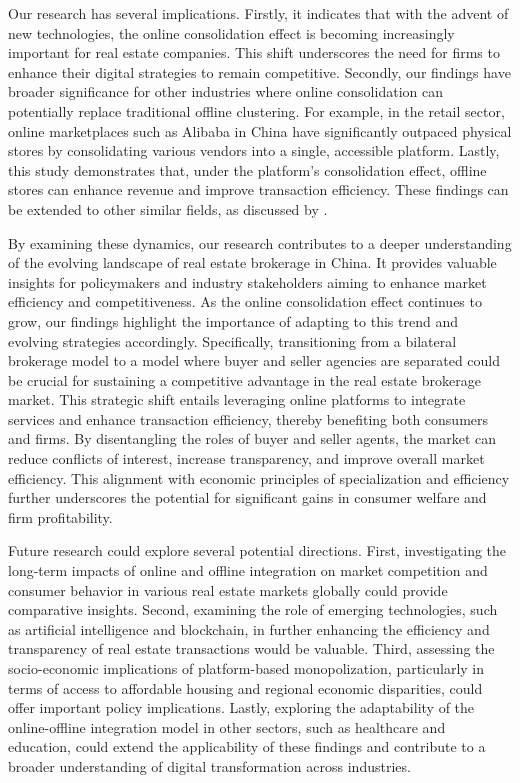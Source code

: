 \documentclass[11pt]{article}
\begin{document}
Our research has several implications. Firstly, it indicates that with the advent of new technologies, the online consolidation effect is becoming increasingly important for real estate companies. This shift underscores the need for firms to enhance their digital strategies to remain competitive. Secondly, our findings have broader significance for other industries where online consolidation can potentially replace traditional offline clustering. For example, in the retail sector, online marketplaces such as Alibaba in China have significantly outpaced physical stores by consolidating various vendors into a single, accessible platform. Lastly, this study demonstrates that, under the platform's consolidation effect, offline stores can enhance revenue and improve transaction efficiency. These findings can be extended to other similar fields, as discussed by \citep{10.1257/jep.28.2.3}.

By examining these dynamics, our research contributes to a deeper understanding of the evolving landscape of real estate brokerage in China. It provides valuable insights for policymakers and industry stakeholders aiming to enhance market efficiency and competitiveness. As the online consolidation effect continues to grow, our findings highlight the importance of adapting to this trend and evolving strategies accordingly. Specifically, transitioning from a bilateral brokerage model to a model where buyer and seller agencies are separated could be crucial for sustaining a competitive advantage in the real estate brokerage market. This strategic shift entails leveraging online platforms to integrate services and enhance transaction efficiency, thereby benefiting both consumers and firms. By disentangling the roles of buyer and seller agents, the market can reduce conflicts of interest, increase transparency, and improve overall market efficiency. This alignment with economic principles of specialization and efficiency further underscores the potential for significant gains in consumer welfare and firm profitability.

Future research could explore several potential directions. First, investigating the long-term impacts of online and offline integration on market competition and consumer behavior in various real estate markets globally could provide comparative insights. Second, examining the role of emerging technologies, such as artificial intelligence and blockchain, in further enhancing the efficiency and transparency of real estate transactions would be valuable. Third, assessing the socio-economic implications of platform-based monopolization, particularly in terms of access to affordable housing and regional economic disparities, could offer important policy implications. Lastly, exploring the adaptability of the online-offline integration model in other sectors, such as healthcare and education, could extend the applicability of these findings and contribute to a broader understanding of digital transformation across industries.
\end{document}
